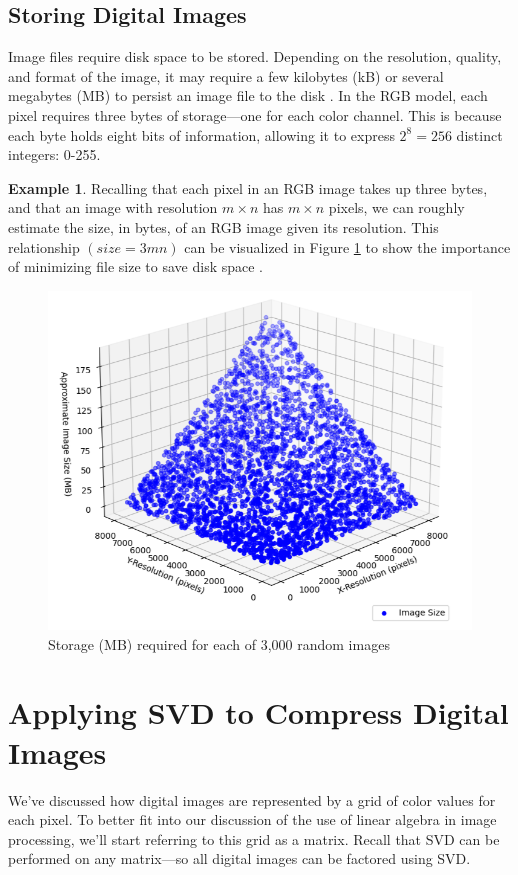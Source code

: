 \documentclass[12pt, reqno]{amsart}
\theoremstyle{definition}
\newtheorem{example}[theorem]{Example}
\theoremstyle{remark}
\numberwithin{equation}{section}
\begin{document}
\subsection{Storing Digital Images}
Image files require disk space to be stored. Depending on the resolution, quality, and format of the image, it may require a few kilobytes (kB) or several megabytes (MB) to persist an image file to the disk \cite{BBC}. In the RGB model, each pixel requires three bytes of storage—one for each color channel. This is because each byte holds eight bits of information, allowing it to express $2^8 = 256$ distinct integers: 0-255.
\begin{example}
    Recalling that each pixel in an RGB image takes up three bytes, and that an image with resolution $m \times n$ has $m \times n$ pixels, we can roughly estimate the size, in bytes, of an RGB image given its resolution. This relationship $(size = 3mn)$ can be visualized in Figure \ref{fig:imgsizes} to show the importance of minimizing file size to save disk space \cite{Lakhotia}.
    \begin{figure}[h]
        \centering
        \includegraphics[width=0.5\linewidth]{img/imagesizes.png}
        \caption{Storage (MB) required for each of 3,000 random images}
        \label{fig:imgsizes}
    \end{figure}
\end{example}

\section{Applying SVD to Compress Digital Images}
\noindent We've discussed how digital images are represented by a grid of color values for each pixel. To better fit into our discussion of the use of linear algebra in image processing, we'll start referring to this grid as a matrix. Recall that SVD can be performed on any matrix—so all digital images can be factored using SVD.\\ 
\end{document}
